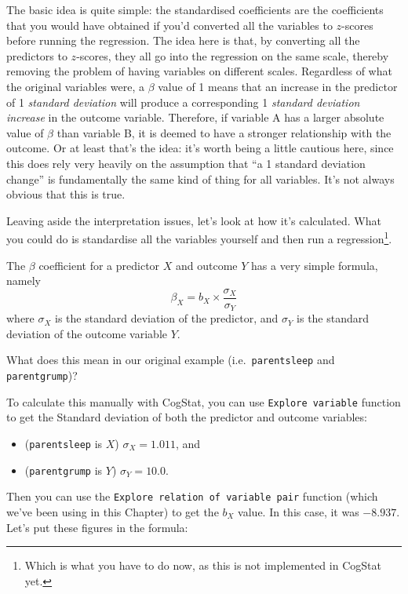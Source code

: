 \documentclass[
  11pt,
  a4paper,
  twoside,symmetric,openright]{book}
\providecommand{\tightlist}{%
  \setlength{\itemsep}{0pt}\setlength{\parskip}{0pt}}
\theoremstyle{break}
\theoremstyle{break}
\begin{document}
The basic idea is quite simple: the standardised coefficients are the coefficients that you would have obtained if you'd converted all the variables to \(z\)-scores before running the regression. The idea here is that, by converting all the predictors to \(z\)-scores, they all go into the regression on the same scale, thereby removing the problem of having variables on different scales. Regardless of what the original variables were, a \(\beta\) value of 1 means that an increase in the predictor of 1 \emph{standard deviation} will produce a corresponding 1 \emph{standard deviation increase} in the outcome variable. Therefore, if variable A has a larger absolute value of \(\beta\) than variable B, it is deemed to have a stronger relationship with the outcome. Or at least that's the idea: it's worth being a little cautious here, since this does rely very heavily on the assumption that ``a 1 standard deviation change'' is fundamentally the same kind of thing for all variables. It's not always obvious that this is true.

Leaving aside the interpretation issues, let's look at how it's calculated. What you could do is standardise all the variables yourself and then run a regression\footnote{Which is what you have to do now, as this is not implemented in CogStat yet.}.

The \(\beta\) coefficient for a predictor \(X\) and outcome \(Y\) has a very simple formula, namely
\[
\beta_X = b_X \times \frac{\sigma_X}{\sigma_Y} 
\]
where \(\sigma_X\) is the standard deviation of the predictor, and \(\sigma_Y\) is the standard deviation of the outcome variable \(Y\).

What does this mean in our original example (i.e.~\texttt{parentsleep} and \texttt{parentgrump})?

To calculate this manually with CogStat, you can use \texttt{Explore\ variable} function to get the Standard deviation of both the predictor and outcome variables:

\begin{itemize}
\tightlist
\item
  (\texttt{parentsleep} is \(X\)) \(\sigma_X = 1.011\), and
\item
  (\texttt{parentgrump} is \(Y\)) \(\sigma_Y = 10.0\).
\end{itemize}

Then you can use the \texttt{Explore\ relation\ of\ variable\ pair} function (which we've been using in this Chapter) to get the \(b_X\) value. In this case, it was \(-8.937\). Let's put these figures in the formula:
\end{document}
